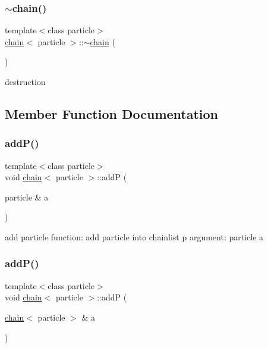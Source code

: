 \hypertarget{classchain_acf3aeeb136a915e80e17aa4221c822a7}{}\label{classchain_acf3aeeb136a915e80e17aa4221c822a7} 
\subsubsection{\texorpdfstring{$\sim$chain()}{~chain()}}
{\footnotesize\ttfamily template$<$class particle$>$ \\
\hyperlink{classchain}{chain}$<$ particle $>$\+::$\sim$\hyperlink{classchain}{chain} (\begin{DoxyParamCaption}{ }\end{DoxyParamCaption})\hspace{0.3cm}{\ttfamily [inline]}}



destruction 



\subsection{Member Function Documentation}
\hypertarget{classchain_a859cdc2249ee280069aa997d455c063b}{}\label{classchain_a859cdc2249ee280069aa997d455c063b} 
\subsubsection{\texorpdfstring{add\+P()}{addP()}\hspace{0.1cm}{\footnotesize\ttfamily [1/3]}}
{\footnotesize\ttfamily template$<$class particle$>$ \\
void \hyperlink{classchain}{chain}$<$ particle $>$\+::addP (\begin{DoxyParamCaption}\item[{particle \&}]{a }\end{DoxyParamCaption})\hspace{0.3cm}{\ttfamily [inline]}}



add particle function\+: add particle into chainlist p argument\+: particle a 

\hypertarget{classchain_a1ad83d089ce15a5bd09ec0bd47a8e0fc}{}\label{classchain_a1ad83d089ce15a5bd09ec0bd47a8e0fc} 
\subsubsection{\texorpdfstring{add\+P()}{addP()}\hspace{0.1cm}{\footnotesize\ttfamily [2/3]}}
{\footnotesize\ttfamily template$<$class particle$>$ \\
void \hyperlink{classchain}{chain}$<$ particle $>$\+::addP (\begin{DoxyParamCaption}\item[{\hyperlink{classchain}{chain}$<$ particle $>$ \&}]{a }\end{DoxyParamCaption})\hspace{0.3cm}{\ttfamily [inline]}}

